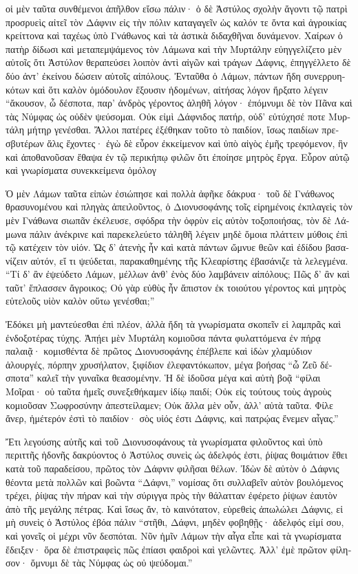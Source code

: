 \documentclass{book}
\begin{document}
\begin{pairs}
\begin{Leftside}
\begin{greek}
  οἱ μὲν ταῦτα συνθέμενοι ἀπῆλθον εἴσω πάλιν· ὁ δὲ Ἀστύλος σχολὴν ἄγοντι τῷ πατρὶ προσρυεὶς αἰτεῖ τὸν Δάφνιν εἰς τὴν πόλιν καταγαγεῖν ὡς καλόν τε ὄντα καὶ ἀγροικίας κρείττονα καὶ ταχέως ὑπὸ Γνάθωνος καὶ τὰ ἀστικὰ διδαχθῆναι δυνάμενον.  Χαίρων ὁ πατὴρ δίδωσι καὶ μεταπεμψάμενος τὸν Λάμωνα καὶ τὴν Μυρτάλην εὐηγγελίζετο μὲν αὐτοῖς ὅτι Ἀστύλον θεραπεύσει λοιπὸν ἀντὶ αἰγῶν καὶ τράγων Δάφνις, ἐπηγγέλλετο δὲ δύο ἀντ’ ἐκείνου δώσειν αὐτοῖς αἰπόλους.  Ἐνταῦθα ὁ Λάμων, πάντων ἤδη συνερρυηκότων καὶ ὅτι καλὸν ὁμόδουλον ἕξουσιν ἡδομένων, αἰτήσας λόγον ἤρξατο λέγειν “ἄκουσον, ὦ δέσποτα, παρ’ ἀνδρὸς γέροντος ἀληθῆ λόγον· ἐπόμνυμι δὲ τὸν Πᾶνα καὶ τὰς Νύμφας ὡς οὐδὲν ψεύσομαι.  Οὐκ εἰμὶ Δάφνιδος πατήρ, οὐδ’ εὐτύχησέ ποτε Μυρτάλη μήτηρ γενέσθαι. Ἄλλοι πατέρες ἐξέθηκαν τοῦτο τὸ παιδίον, ἴσως παιδίων πρεσβυτέρων ἅλις ἔχοντες· ἐγὼ δὲ εὗρον ἐκκείμενον καὶ ὑπὸ αἰγὸς ἐμῆς τρεφόμενον, ἣν καὶ ἀποθανοῦσαν ἔθαψα ἐν τῷ περικήπῳ φιλῶν ὅτι ἐποίησε μητρὸς ἔργα.  Εὗρον αὐτῷ καὶ γνωρίσματα συνεκκείμενα ὁμόλογ
\pend


  Ὁ μὲν Λάμων ταῦτα εἰπὼν ἐσιώπησε καὶ πολλὰ ἀφῆκε δάκρυα· τοῦ δὲ Γνάθωνος θρασυνομένου καὶ πληγὰς ἀπειλοῦντος, ὁ Διονυσοφάνης τοῖς εἰρημένοις ἐκπλαγεὶς τὸν μὲν Γνάθωνα σιωπᾶν ἐκέλευσε, σφόδρα τὴν ὀφρὺν εἰς αὐτὸν τοξοποιήσας, τὸν δὲ Λάμωνα πάλιν ἀνέκρινε καὶ παρεκελεύετο τἀληθῆ λέγειν μηδὲ ὅμοια πλάττειν μύθοις ἐπὶ τῷ κατέχειν τὸν υἱόν.  Ὡς δ’ ἀτενὴς ἦν καὶ κατὰ πάντων ὤμνυε θεῶν καὶ ἐδίδου βασανίζειν αὑτόν, εἴ τι ψεύδεται, παρακαθημένης τῆς Κλεαρίστης ἐβασάνιζε τὰ λελεγμένα. “Τί δ’ ἂν ἐψεύδετο Λάμων, μέλλων ἀνθ’ ἑνὸς δύο λαμβάνειν αἰπόλους; Πῶς δ’ ἂν καὶ ταῦτ’ ἔπλασσεν ἄγροικος; Οὐ γὰρ εὐθὺς ἦν ἄπιστον ἐκ τοιούτου γέροντος καὶ μητρὸς εὐτελοῦς υἱὸν καλὸν οὕτω γενέσθαι;”
\pend


  Ἐδόκει μὴ μαντεύεσθαι ἐπὶ πλέον, ἀλλὰ ἤδη τὰ γνωρίσματα σκοπεῖν εἰ λαμπρᾶς καὶ ἐνδοξοτέρας τύχης. Ἀπῄει μὲν Μυρτάλη κομιοῦσα πάντα φυλαττόμενα ἐν πήρᾳ παλαιᾷ·  κομισθέντα δὲ πρῶτος Διονυσοφάνης ἐπέβλεπε καὶ ἰδὼν χλαμύδιον ἁλουργές, πόρπην χρυσήλατον, ξιφίδιον ἐλεφαντόκωπον, μέγα βοήσας “ὦ Ζεῦ δέσποτα” καλεῖ τὴν γυναῖκα θεασομένην.  Ἡ δὲ ἰδοῦσα μέγα καὶ αὐτὴ βοᾷ “φίλαι Μοῖραι· οὐ ταῦτα ἡμεῖς συνεξεθήκαμεν ἰδίῳ παιδί; Οὐκ εἰς τούτους τοὺς ἀγροὺς κομιοῦσαν Σωφροσύνην ἀπεστείλαμεν; Οὐκ ἄλλα μὲν οὖν, ἀλλ’ αὐτὰ ταῦτα. Φίλε ἄνερ, ἡμέτερόν ἐστὶ τὸ παιδίον· σὸς υἱός ἐστι Δάφνις, καὶ πατρῴας ἔνεμεν αἶγας.”
\pend


  Ἔτι λεγούσης αὐτῆς καὶ τοῦ Διονυσοφάνους τὰ γνωρίσματα φιλοῦντος καὶ ὑπὸ περιττῆς ἡδονῆς δακρύοντος ὁ Ἀστύλος συνεὶς ὡς ἀδελφός ἐστι, ῥίψας θοιμάτιον ἔθει κατὰ τοῦ παραδείσου, πρῶτος τὸν Δάφνιν φιλῆσαι θέλων.  Ἰδὼν δὲ αὐτὸν ὁ Δάφνις θέοντα μετὰ πολλῶν καὶ βοῶντα “Δάφνι,” νομίσας ὅτι συλλαβεῖν αὐτὸν βουλόμενος τρέχει, ῥίψας τὴν πήραν καὶ τὴν σύριγγα πρὸς τὴν θάλατταν ἐφέρετο ῥίψων ἑαυτὸν ἀπὸ τῆς μεγάλης πέτρας.  Καὶ ἴσως ἄν, τὸ καινότατον, εὑρεθεὶς ἀπωλώλει Δάφνις, εἰ μὴ συνεὶς ὁ Ἀστύλος ἐβόα πάλιν “στῆθι, Δάφνι, μηδὲν φοβηθῇς· ἀδελφός εἰμί σου, καὶ γονεῖς οἱ μέχρι νῦν δεσπόται.  Νῦν ἡμῖν Λάμων τὴν αἶγα εἶπε καὶ τὰ γνωρίσματα ἔδειξεν· ὅρα δὲ ἐπιστραφεὶς πῶς ἐπίασι φαιδροὶ καὶ γελῶντες. Ἀλλ’ ἐμὲ πρῶτον φίλησον· ὄμνυμι δὲ τὰς Νύμφας ὡς οὐ ψεύδομαι.”
\pend



\end{greek}
\end{Leftside}
\end{pairs}
\end{document}
